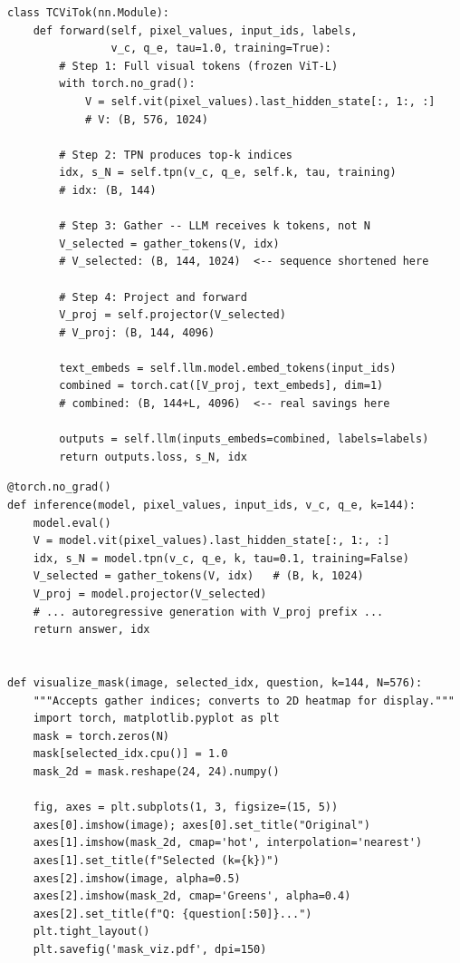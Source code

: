 \documentclass[11pt,a4paper]{article}
\begin{document}
\begin{lstlisting}[caption={TCViTok forward pass using gather.}]
class TCViTok(nn.Module):
    def forward(self, pixel_values, input_ids, labels,
                v_c, q_e, tau=1.0, training=True):
        # Step 1: Full visual tokens (frozen ViT-L)
        with torch.no_grad():
            V = self.vit(pixel_values).last_hidden_state[:, 1:, :]
            # V: (B, 576, 1024)

        # Step 2: TPN produces top-k indices
        idx, s_N = self.tpn(v_c, q_e, self.k, tau, training)
        # idx: (B, 144)

        # Step 3: Gather -- LLM receives k tokens, not N
        V_selected = gather_tokens(V, idx)
        # V_selected: (B, 144, 1024)  <-- sequence shortened here

        # Step 4: Project and forward
        V_proj = self.projector(V_selected)
        # V_proj: (B, 144, 4096)

        text_embeds = self.llm.model.embed_tokens(input_ids)
        combined = torch.cat([V_proj, text_embeds], dim=1)
        # combined: (B, 144+L, 4096)  <-- real savings here

        outputs = self.llm(inputs_embeds=combined, labels=labels)
        return outputs.loss, s_N, idx
\end{lstlisting}

\begin{lstlisting}[caption={Inference with gather.}]
@torch.no_grad()
def inference(model, pixel_values, input_ids, v_c, q_e, k=144):
    model.eval()
    V = model.vit(pixel_values).last_hidden_state[:, 1:, :]
    idx, s_N = model.tpn(v_c, q_e, k, tau=0.1, training=False)
    V_selected = gather_tokens(V, idx)   # (B, k, 1024)
    V_proj = model.projector(V_selected)
    # ... autoregressive generation with V_proj prefix ...
    return answer, idx


def visualize_mask(image, selected_idx, question, k=144, N=576):
    """Accepts gather indices; converts to 2D heatmap for display."""
    import torch, matplotlib.pyplot as plt
    mask = torch.zeros(N)
    mask[selected_idx.cpu()] = 1.0
    mask_2d = mask.reshape(24, 24).numpy()

    fig, axes = plt.subplots(1, 3, figsize=(15, 5))
    axes[0].imshow(image); axes[0].set_title("Original")
    axes[1].imshow(mask_2d, cmap='hot', interpolation='nearest')
    axes[1].set_title(f"Selected (k={k})")
    axes[2].imshow(image, alpha=0.5)
    axes[2].imshow(mask_2d, cmap='Greens', alpha=0.4)
    axes[2].set_title(f"Q: {question[:50]}...")
    plt.tight_layout()
    plt.savefig('mask_viz.pdf', dpi=150)
\end{lstlisting}
\end{document}
